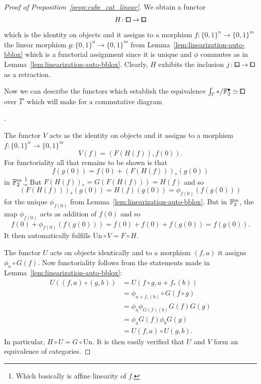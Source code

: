 \begin{proof}[Proof of Proposition~\ref{prop:cube_cat_linear}]
We obtain a functor
\[
    H\colon{\bbox}\to{\bblox}
\]
which is the identity on objects and it assigns to a morphism $f\colon\{0,1\}^n\to\{0,1\}^m$
the linear morphism $g\colon\{0,1\}^n\to\{0,1\}^m$ from Lemma~\ref{lem:linearization-auto-bblox} which is a functorial assignment since it is unique
and $\phi$ commutes as in Lemma~\ref{lem:linearization-auto-bblox}.
Clearly, $H$ exhibits the inclusion $j\colon{\bblox}\to{\bbox}$ as a retraction.

Now we can describe the functors which establish the equivalence $\int_{\bbGamma} \ast/\F_2^\bullet\simeq{\bbox}$ over $\bbGamma$ which will make for a commutative diagram
\begin{center}
.
\end{center}
The functor $V$ acts as the identity on objects and it assigns to a morphism $f\colon\{0,1\}^n\to\{0,1\}^m$
\[
    V(f) = (F(H(f)),f(0)).
\]
For functoriality all that remains to be shown is that
\[
    f(g(0)) = f(0) + (F(H(f)))_\ast(g(0))
\]
in $\mathbb{F}_2^m$.\footnote{Which basically is affine linearity of $f$.}
But $F(H(f))_\ast = G(F(H(f))) = H(f)$ and so
\[
    (F(H(f)))_\ast(g(0)) = H(f)(g(0)) = \phi_{f(0)}(f(g(0)))
\]
for the unique $\phi_{f(0)}$ from Lemma~\ref{lem:linearization-auto-bblox}.
But in $\mathbb{F}_2^m$, the map $\phi_{f(0)}$ acts as addition of $f(0)$ and so
\[
    f(0)+\phi_{f(0)}(f(g(0))) = f(0) + f(0) + f(g(0)) = f(g(0)).
\]
It then automatically fulfills $\mathrm{Un}\circ V = F\circ H$.

The functor $U$ acts on objects identically and to a morphism $(f,a)$ it assigns $\phi_a\circ G(f)$.
Now functoriality follows from the statements made in Lemma~\ref{lem:linearization-auto-bblox}:
\begin{align*}
        U((f,a)\circ(g,b))
    &=  U(f\circ g,a+f_\ast(b)) \\
    &=  \phi_{a+f_\ast(b)}\circ G(f\circ g) \\
    &=  \phi_a\phi_{G(f)(b)}G(f)G(g) \\
    &=  \phi_a G(f)\phi_b G(g) \\
    &=  U(f,a)\circ U(g,b).
\end{align*}
In particular, $H\circ U = G\circ\mathrm{Un}$.
It is then easily verified that $U$ and $V$ form an equivalence of categories.
\end{proof}

